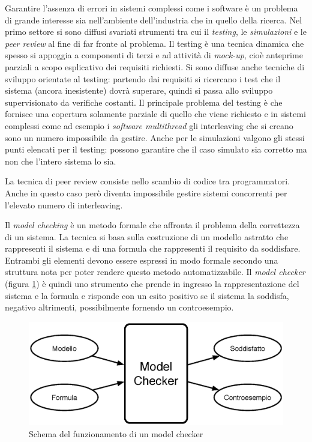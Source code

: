 
Garantire l'assenza di errori in sistemi complessi come i software è un problema di grande interesse sia nell'ambiente dell'industria che in quello della ricerca. Nel primo settore si sono diffusi svariati strumenti tra cui il \emph{testing}, le \emph{simulazioni} e le \emph{peer review} al fine di far fronte al problema. Il testing è una tecnica dinamica che spesso si appoggia a componenti di terzi e ad attività di \emph{mock-up}, cioè anteprime parziali a scopo esplicativo dei requisiti richiesti. Si sono diffuse anche tecniche di sviluppo orientate al testing: partendo dai requisiti si ricercano i test che il sistema (ancora inesistente) dovrà superare, quindi si passa allo sviluppo supervisionato da verifiche costanti. Il principale problema del testing è che fornisce una copertura solamente parziale di quello che viene richiesto e in sistemi complessi come ad esempio i \emph{software multithread} gli interleaving che si creano sono un numero impossibile da gestire. Anche per le simulazioni valgono gli stessi punti elencati per il testing: possono garantire che il caso simulato sia corretto ma non che l'intero sistema lo sia.

La tecnica di peer review consiste nello scambio di codice tra programmatori. Anche in questo caso però diventa impossibile gestire sistemi concorrenti per l'elevato numero di interleaving.

Il \emph{model checking} è un metodo formale che affronta il problema della correttezza di un sistema. La tecnica si basa sulla costruzione di un modello astratto che rappresenti il sistema e di una formula che rappresenti il requisito da soddisfare. Entrambi gli elementi devono essere espressi in modo formale secondo una struttura nota per poter rendere questo metodo automatizzabile. Il \emph{model checker} (figura \ref{fig:modelchecker}) è quindi uno strumento che prende in ingresso la rappresentazione del sistema e la formula e risponde con un esito positivo se il sistema la soddisfa, negativo altrimenti, possibilmente fornendo un controesempio.
\begin{figure}[htb]
	\begin{center}
		\includegraphics[width=.8\textwidth]{Images/mc.eps}
	\end{center}
\caption{Schema del funzionamento di un model checker}
\label{fig:modelchecker}
\end{figure}

